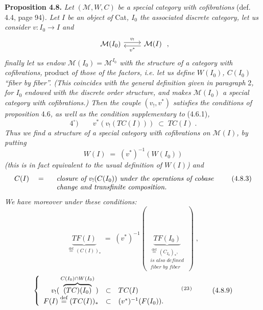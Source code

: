 \documentclass[11pt]{article}
\newcommand{\printedpage}[1]{\marginpar{\footnotesize p.~#1}}
\newcommand{\msp}[1]{\marginpar{\footnotesize [#1]}}
\newcommand{\defeq}{\overset{\text{def}}{=}}
\newcommand{\fnm}[1]{\textsuperscript{(}\footnotemark[#1]\textsuperscript{)}}
\begin{document}
\textbf{Proposition 4.8.} \textit{Let} $(\mathcal{M}, W, C)$ \textit{be a special category with cofibrations} (def. 4.4, page 94)\textit{. Let $I$ be an object of} Cat\textit{, $I_0$ the associated discrete category, let us consider $v : I_0 \longrightarrow I$ and} %
\printedpage{40}
\[
\begin{tikzcd}
\mathcal{M}(I_0) \arrow[r, shift left, "v_{!}"] & \mathcal{M}(I) \arrow[l, shift left, "v^{*}"]
\end{tikzcd} \; ,
\]
\textit{finally let us endow $\mathcal{M}(I_0) = \mathcal{M}^{I_0}$ with the structure of a category with cofibrations,} product \textit{of those of the factors, i.e. let us define $W(I_0)$, $C(I_0)$ ``fiber by fiber''. (This coincides with the general definition given in paragraph} 2\textit{, for $I_0$ endowed with the discrete order structure, and makes $\mathcal{M}(I_0)$ a special category with cofibrations.) Then the couple $(v_{!}, v^{*})$ satisfies} \msp{page 82} \textit{the conditions of proposition} 4.6\textit{, as well as the condition supplementary to} (4.6.1)\textit{,}
\[
4^{\circ}) \qquad v^{*}(v_{!}(TC(I))) \;\subset\; TC(I) \; .
\tag*{(4.8.1)}
\]
\textit{Thus we find a structure of a special category with cofibrations on $\mathcal{M}(I)$, by putting}
\[
W(I) \;=\; (v^{*})^{-1}(W(I_0))
\tag*{(4.8.2)}
\]
\textit{(this is in fact equivalent to the usual definition of $W(I)$) and}
\[
C(I) \quad = \quad
\begin{array}[t]{l}
\textit{closure of } v_{!}(C(I_0)) \textit{ under the operations of cobase}\\
\textit{change and transfinite composition.}
\end{array}
\tag*{(4.8.3)}
\]
\textit{We have moreover under these conditions:}
\[
\underbrace{TF(I)}_{\defeq\,(C(I))_{*}} \;=\; (v^{*})^{-1}( \; \underbrace{TF(I_0)}_{\substack{\defeq\,(C_{I_0})_{*},\\ \textit{is also defined}\\ \textit{fiber by fiber}}} \; ) \; ,
\tag*{(4.8.8)}
\]
\[
\left\{
\begin{array}{rcl}
v_{!}( \, \overbrace{(TC)(I_0)}^{C(I_0)\cap W(I_0)} \, ) & \subset & TC(I) \qquad\qquad\qquad \text{\fnm{23}} \\
F(I) \defeq (TC(I))_{*} & \subset & (v^{*})^{-1}(F(I_0)).
\end{array}
\right.
\tag*{(4.8.9)}
\]
\end{document}
